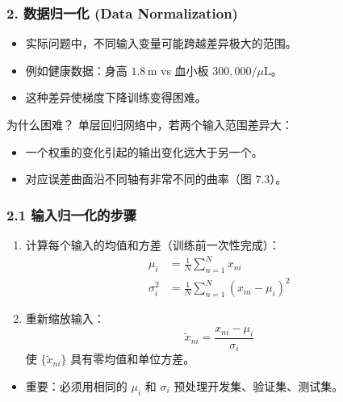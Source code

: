 \documentclass[t,aspectratio=169]{beamer} %
\begin{document}
\begin{frame}
    \frametitle{2. 数据归一化 (Data Normalization)}
    \begin{itemize}
        \item 实际问题中，不同输入变量可能跨越\alert{差异极大的范围}。
        \item 例如健康数据：身高 $1.8\,\mathrm{m}$ vs 血小板 $300{,}000/\mu\mathrm{L}$。
        \item 这种差异使梯度下降训练\alert{变得困难}。
    \end{itemize}
    \begin{block}{为什么困难？}
        单层回归网络中，若两个输入范围差异大：
        \begin{itemize}
            \item 一个权重的变化引起的输出变化远大于另一个。
            \item 对应误差曲面沿不同轴有\alert{非常不同的曲率}（图 7.3）。
        \end{itemize}
    \end{block}
\end{frame}

\begin{frame}
    \frametitle{2.1 输入归一化的步骤}
    \begin{enumerate}
        \item 计算每个输入的均值和方差（\alert{训练前一次性完成}）：
        \begin{align}
            \mu_i &= \frac{1}{N} \sum_{n=1}^N x_{ni} \tag{7.48} \\
            \sigma_i^2 &= \frac{1}{N} \sum_{n=1}^N (x_{ni} - \mu_i)^2 \tag{7.49}
        \end{align}
        \item 重新缩放输入：
        \begin{equation}
            \widetilde{x}_{ni} = \frac{x_{ni} - \mu_i}{\sigma_i} \tag{7.50}
        \end{equation}
        使 $\{\widetilde{x}_{ni}\}$ 具有\alert{零均值和单位方差}。
    \end{enumerate}
    \begin{itemize}
        \item \alert{重要}：必须用相同的 $\mu_i$ 和 $\sigma_i$ 预处理开发集、验证集、测试集。
    \end{itemize}
\end{frame}
\end{document}
